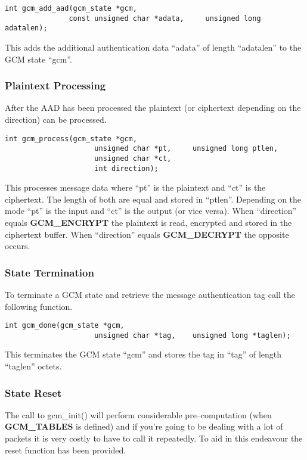 \documentclass[a4paper]{book}
\begin{document}
\begin{verbatim}
int gcm_add_aad(gcm_state *gcm, 
               const unsigned char *adata,     unsigned long adatalen);
\end{verbatim}
This adds the additional authentication data ``adata'' of length ``adatalen'' to the GCM state ``gcm''.

\subsubsection{Plaintext Processing}
After the AAD has been processed the plaintext (or ciphertext depending on the direction) can be processed.  

\begin{verbatim}
int gcm_process(gcm_state *gcm,
                     unsigned char *pt,     unsigned long ptlen,
                     unsigned char *ct,
                     int direction);
\end{verbatim}
This processes message data where ``pt'' is the plaintext and ``ct'' is the ciphertext.  The length of both are equal and stored in ``ptlen''.  Depending on the 
mode ``pt'' is the input and ``ct'' is the output (or vice versa).  When ``direction'' equals \textbf{GCM\_ENCRYPT} the plaintext is read, encrypted and stored
in the ciphertext buffer.  When ``direction'' equals \textbf{GCM\_DECRYPT} the opposite occurs.

\subsubsection{State Termination}
To terminate a GCM state and retrieve the message authentication tag call the following function.

\begin{verbatim}
int gcm_done(gcm_state *gcm, 
                     unsigned char *tag,    unsigned long *taglen);
\end{verbatim}
This terminates the GCM state ``gcm'' and stores the tag in ``tag'' of length ``taglen'' octets.

\subsubsection{State Reset}
The call to gcm\_init() will perform considerable pre--computation (when \textbf{GCM\_TABLES} is defined) and if you're going to be dealing with a lot of packets
it is very costly to have to call it repeatedly.  To aid in this endeavour the reset function has been provided.
\end{document}
